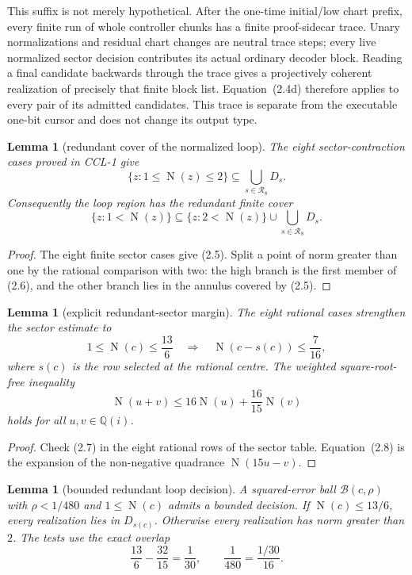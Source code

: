 \documentclass[10pt]{article}
\newtheorem{lemma}[theorem]{Lemma}
\theoremstyle{definition}
\theoremstyle{remark}
\newcommand{\Qi}{\mathbb{Q}(i)}
\newcommand{\Norm}{\operatorname{N}}
\begin{document}
This suffix is not merely hypothetical.  After the one-time initial/low chart
prefix, every finite run of whole controller chunks has a finite proof-sidecar
trace.  Unary normalizations and residual chart changes are neutral trace
steps; every live normalized sector decision contributes its actual ordinary
decoder block.  Reading a final candidate backwards through the trace gives a
projectively coherent realization of precisely that finite block list.
Equation~(2.4d) therefore applies to every pair of its admitted candidates.
This trace is separate from the executable one-bit cursor and does not change
its output type.

\begin{lemma}[redundant cover of the normalized loop]
The eight sector-contraction cases proved in CCL-1 give
\[
 \{z:1\le\Norm(z)\le2\}\subseteq\bigcup_{s\in\mathcal R_8}D_s.
\tag{2.5}
\]
Consequently the loop region has the redundant finite cover
\[
 \{z:1<\Norm(z)\}
 \subseteq
 \{z:2<\Norm(z)\}\cup\bigcup_{s\in\mathcal R_8}D_s.
\tag{2.6}
\]
\end{lemma}

\begin{proof}
The eight finite sector cases give (2.5).  Split a point of norm greater than
one by the rational comparison with two: the high branch is the first member
of (2.6), and the other branch lies in the annulus covered by (2.5).
\end{proof}

\begin{lemma}[explicit redundant-sector margin]
The eight rational cases strengthen the sector estimate to
\[
 1\le\Norm(c)\le\frac{13}{6}
 \quad\Longrightarrow\quad
 \Norm(c-s(c))\le\frac7{16},
\tag{2.7}
\]
where $s(c)$ is the row selected at the rational centre.  The weighted square-root-free inequality
\[
 \Norm(u+v)\le16\Norm(u)+\frac{16}{15}\Norm(v)
\tag{2.8}
\]
holds for all $u,v\in\Qi$.
\end{lemma}

\begin{proof}
Check (2.7) in the eight rational rows of the sector table.  Equation~(2.8)
is the expansion of the non-negative quadrance $\Norm(15u-v)$.
\end{proof}

\begin{lemma}[bounded redundant loop decision]
\label{lem:bounded-loop-decision}
A squared-error ball $\mathcal B(c,\rho)$ with $\rho<1/480$ and
$1\le\Norm(c)$ admits a bounded decision.  If $\Norm(c)\le13/6$, every
realization lies in $D_{s(c)}$.  Otherwise every realization has norm greater
than $2$.  The tests use the exact overlap
\[
 \frac{13}{6}-\frac{32}{15}=\frac1{30},
 \qquad \frac1{480}=\frac{1/30}{16}.
\tag{2.9}
\]
\end{lemma}
\end{document}
